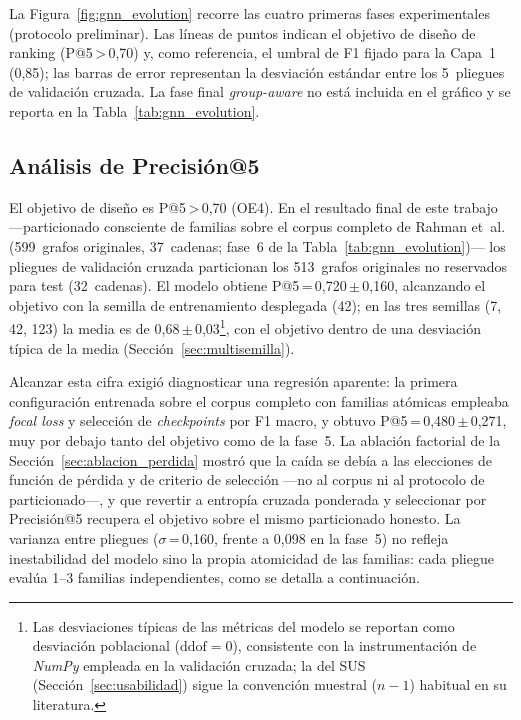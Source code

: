 La Figura~\ref{fig:gnn_evolution} recorre las cuatro primeras fases experimentales
(protocolo preliminar). Las líneas de puntos indican
el objetivo de diseño de ranking (P@5\,>\,0,70) y, como referencia, el umbral de
F1 fijado para la Capa~1 (0,85); las barras de error
representan la desviación estándar entre los 5~pliegues de validación cruzada. La
fase final \textit{group-aware} no está incluida en el gráfico y se reporta en la
Tabla~\ref{tab:gnn_evolution}.

\subsection{Análisis de Precisión@5}

El objetivo de diseño es P@5\,>\,0,70 (OE4). En el resultado final de este trabajo
—particionado consciente de familias sobre el corpus completo de Rahman et~al.
(599~grafos originales, 37~cadenas; fase~6 de la Tabla~\ref{tab:gnn_evolution})—
los pliegues de validación cruzada particionan los 513~grafos originales no
reservados para test (32~cadenas). El modelo obtiene
P@5\,=\,0,720\,\(\pm\)\,0,160, alcanzando el objetivo con la semilla de
entrenamiento desplegada (42); en las tres semillas (7, 42, 123) la media es
de 0,68\,\(\pm\)\,0,03\footnote{Las desviaciones típicas de las métricas del modelo
se reportan como desviación poblacional (\(\text{ddof}=0\)), consistente con la
instrumentación de \textit{NumPy} empleada en la validación cruzada; la del \ac{SUS}
(Sección~\ref{sec:usabilidad}) sigue la convención muestral (\(n-1\)) habitual en su
literatura.}, con el objetivo dentro de una desviación típica de la
media (Sección~\ref{sec:multisemilla}).

Alcanzar esta cifra exigió diagnosticar una regresión aparente: la primera
configuración entrenada sobre el corpus completo con familias atómicas empleaba
\textit{focal loss} y selección de \textit{checkpoints} por F1 macro, y obtuvo
P@5\,=\,0,480\,\(\pm\)\,0,271, muy por debajo tanto del objetivo como de la
fase~5. La ablación factorial de la Sección~\ref{sec:ablacion_perdida} mostró
que la caída se debía a las elecciones de función de pérdida y de criterio de
selección —no al corpus ni al protocolo de particionado—, y que revertir a
entropía cruzada ponderada y seleccionar por Precisión@5 recupera el objetivo
sobre el mismo particionado honesto. La varianza entre pliegues
(\(\sigma\)\,=\,0,160, frente a 0,098 en la fase~5) no refleja inestabilidad del
modelo sino la propia atomicidad de las familias: cada pliegue evalúa 1--3
familias independientes, como se detalla a continuación.


